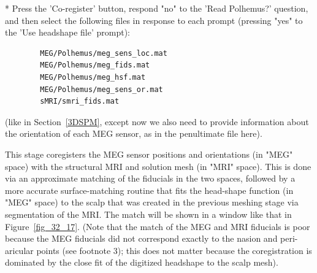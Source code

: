 * Press the 'Co-register' button, respond "no" to the 'Read Polhemus?' question, and then select the following files in response to each prompt (pressing "yes" to the 'Use headshape file' prompt):
\begin{verbatim}
  		MEG/Polhemus/meg_sens_loc.mat
   		MEG/Polhemus/meg_fids.mat
   		MEG/Polhemus/meg_hsf.mat   	
  		MEG/Polhemus/meg_sens_or.mat	
		sMRI/smri_fids.mat
\end{verbatim}
	(like in Section~\ref{3DSPM}, except now we also need to provide information about the orientation of each MEG sensor, as in the penultimate file here).

This stage coregisters the MEG sensor positions and orientations (in "MEG" space) with the structural MRI and solution mesh (in "MRI" space). This is done via an approximate matching of the fiducials in the two spaces, followed by a more accurate surface-matching routine that fits the head-shape function (in "MEG" space) to the scalp that was created in the previous meshing stage via segmentation of the MRI. The match will be shown in a window like that in Figure~\ref{fig_32_17}. (Note that the match of the MEG and MRI fiducials is poor because the MEG fiducials did not correspond exactly to the nasion and peri-aricular points (see footnote 3); this does not matter because the coregistration is dominated by the close fit of the digitized headshape to the scalp mesh).

